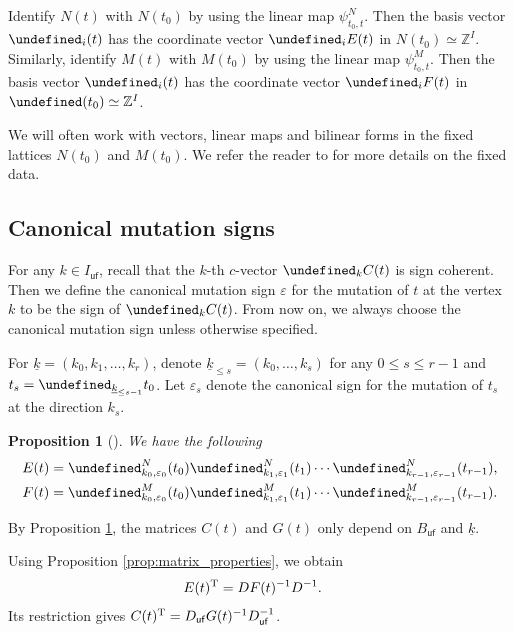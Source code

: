 \documentclass[10pt,a4paper]{amsart}
\newcommand{\Z}{\mathbb{Z}}
\newcommand{\opname}[1]{\operatorname{\mathsf{#1}}}
\newcommand{\uk}{{\underline{k}}}
\newcommand{\ufv}{\opname{uf}}
\let\Mc\undefined
\let\col\undefined
\let\seq\undefined
\let\trans\undefined
\let\ee\undefined
\let\ff\undefined
\newcommand{\Mc}{M^\circ}
\newcommand{\col}{\opname{col}}
\newcommand{\seq}{\boldsymbol{\mu}}%
\newcommand{\trans}{\opname{P}}
\newcommand{\ee}{\mathbf{e}}
\newcommand{\ff}{\mathbf{f}}
\numberwithin{equation}{section}
\newtheorem{Proposition}[Theorem]{Proposition}
 { \theoremstyle{definition}
\newtheorem{Definition}[Theorem]{Definition}
\newtheorem{Note}[Theorem]{Note}
\newtheorem{Example}[Theorem]{Example}
\newtheorem{Remark}[Theorem]{Remark}
\newtheorem{Assumption}[Theorem]{Assumption}
}
\begin{document}
Identify $N(t)$ with $N(t_{0})$ by using the linear map $\psi_{t_{0},t}^{N}$.
Then the basis vector $\ee_{i}(t)$ has the coordinate vector $\col_{i}E(t)$
in $N(t_{0})\simeq\Z^{I}$. Similarly, identify $M(t)$ with $M(t_{0})$
by using the linear map $\psi_{t_{0},t}^{M}$. Then the basis vector
$\ff_{i}(t)$ has the coordinate vector $\col_{i}F(t)$ in $\Mc(t_{0})\simeq\Z^{I}$.

We will often work with vectors, linear maps and bilinear forms in
the fixed lattices $N(t_{0})$ and $M(t_{0})$. We refer the reader
to \cite{gross2013birational} for more details on the fixed data.

\subsection{Canonical mutation signs}

For any $k\in I_{\ufv}$, recall that the $k$-th $c$-vector $\col_{k}C(t)$
is sign coherent. Then we define the canonical mutation sign $\varepsilon$
for the mutation of $t$ at the vertex $k$ to be the sign of $\col_{k}C(t)$.
From now on, we always choose the canonical mutation sign unless otherwise
specified.

For $\uk=(k_{0},k_{1},\ldots,k_{r})$, denote $\uk_{\leq s}=(k_{0},\ldots,k_{s})$
for any $0\leq s\leq r-1$ and $t_{s}=\seq_{\uk_{\leq s-1}}t_{0}$.
Let $\varepsilon_{s}$ denote the canonical sign for the mutation
of $t_{s}$ at the direction $k_{s}$.

\begin{Proposition}[{\cite{gross2018canonical,nakanishi2012tropical}}]\label{prop:recursive_bases}
We have the following
\begin{gather*}%
E(t) =\trans_{k_0,\varepsilon_{0}}^{N}(t_{0})\trans_{k_1,\varepsilon_{1}}^{N}(t_{1})\cdots\trans_{k_{r-1},\varepsilon_{r-1}}^{N}(t_{r-1}),\\
F(t) =\trans_{k_0,\varepsilon_{0}}^{M}(t_{0})\trans_{k_1,\varepsilon_{1}}^{M}(t_{1})\cdots\trans_{k_{r-1},\varepsilon_{r-1}}^{M}(t_{r-1}).
\end{gather*}
\end{Proposition}
By Proposition \ref{prop:recursive_bases}, the matrices $C(t)$ and $G(t)$ only depend on $B_{\ufv}$
and $\uk$.

Using Proposition \ref{prop:matrix_properties}, we obtain
\begin{align}
E(t)^{\rm T}=DF(t)^{-1}D^{-1} &.\label{eq:E_D_F_relation}
\end{align}
Its restriction gives $C(t)^{\rm T}=D_{\ufv}G(t)^{-1}D_{\ufv}^{-1}$.
\end{document}
